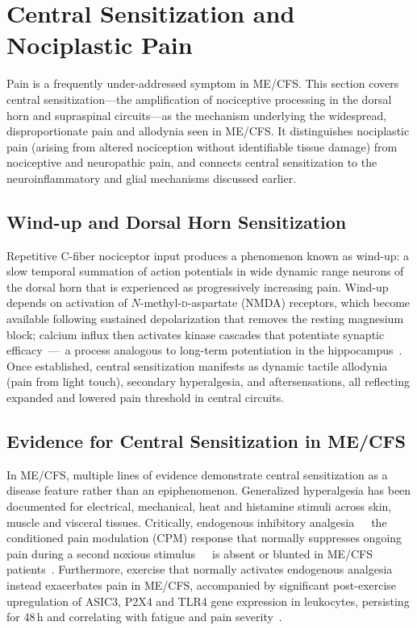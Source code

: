 \section{Central Sensitization and Nociplastic Pain}
\label{sec:ch15-central-sensitization}

Pain is a frequently under-addressed symptom in ME/CFS. This section covers central sensitization---the amplification of nociceptive processing in the dorsal horn and supraspinal circuits---as the mechanism underlying the widespread, disproportionate pain and allodynia seen in ME/CFS. It distinguishes nociplastic pain (arising from altered nociception without identifiable tissue damage) from nociceptive and neuropathic pain, and connects central sensitization to the neuroinflammatory and glial mechanisms discussed earlier.

\subsection{Wind-up and Dorsal Horn Sensitization}

Repetitive C-fiber nociceptor input produces a phenomenon known as wind-up: a slow temporal summation of action potentials in wide dynamic range neurons of the dorsal horn that is experienced as progressively increasing pain. Wind-up depends on activation of \(N\)-methyl-\textsc{d}-aspartate (NMDA) receptors, which become available following sustained depolarization that removes the resting magnesium block; calcium influx then activates kinase cascades that potentiate synaptic efficacy~---~a process analogous to long-term potentiation in the hippocampus~\cite{Woolf2011CentralSensitization}. Once established, central sensitization manifests as dynamic tactile allodynia (pain from light touch), secondary hyperalgesia, and aftersensations, all reflecting expanded and lowered pain threshold in central circuits.

\subsection{Evidence for Central Sensitization in ME/CFS}

In ME/CFS, multiple lines of evidence demonstrate central sensitization as a disease feature rather than an epiphenomenon. Generalized hyperalgesia has been documented for electrical, mechanical, heat and histamine stimuli across skin, muscle and visceral tissues. Critically, endogenous inhibitory analgesia~~~the conditioned pain modulation (CPM) response that normally suppresses ongoing pain during a second noxious stimulus~~~is absent or blunted in ME/CFS patients~\cite{Nijs2012muscle}. Furthermore, exercise that normally activates endogenous analgesia instead exacerbates pain in ME/CFS, accompanied by significant post-exercise upregulation of ASIC3, P2X4 and TLR4 gene expression in leukocytes, persisting for 48\,h and correlating with fatigue and pain severity~\cite{Nijs2012painCFS}.

